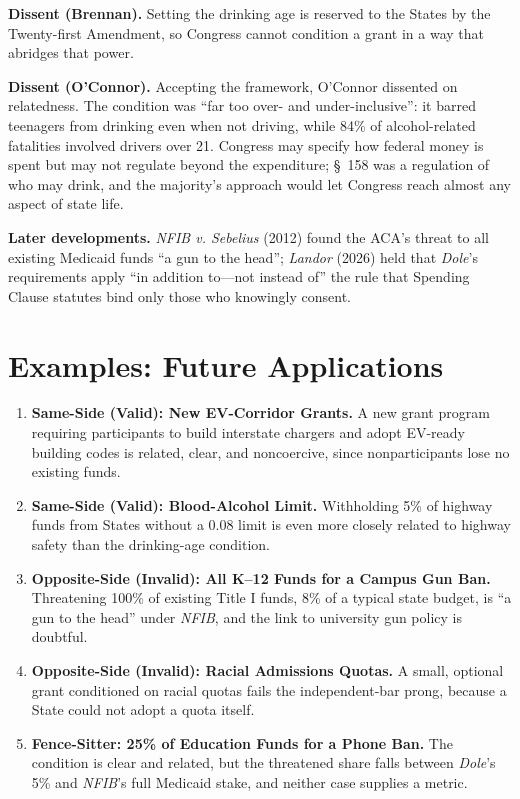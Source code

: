 \documentclass[12pt]{article}
\begin{document}
\textbf{Dissent (Brennan).} Setting the drinking age is reserved to the States by the Twenty-first Amendment, so Congress cannot condition a grant in a way that abridges that power.

\textbf{Dissent (O'Connor).} Accepting the framework, O'Connor dissented on relatedness. The condition was ``far too over- and under-inclusive'': it barred teenagers from drinking even when not driving, while 84\% of alcohol-related fatalities involved drivers over 21. Congress may specify how federal money is spent but may not regulate beyond the expenditure; \S~158 was a regulation of who may drink, and the majority's approach would let Congress reach almost any aspect of state life.

\textbf{Later developments.} \textit{NFIB v. Sebelius} (2012) found the ACA's threat to all existing Medicaid funds ``a gun to the head''; \textit{Landor} (2026) held that \textit{Dole}'s requirements apply ``in addition to---not instead of'' the rule that Spending Clause statutes bind only those who knowingly consent.

\section{Examples: Future Applications}

\begin{enumerate}
\item \textbf{Same-Side (Valid): New EV-Corridor Grants.} A new grant program requiring participants to build interstate chargers and adopt EV-ready building codes is related, clear, and noncoercive, since nonparticipants lose no existing funds.
\item \textbf{Same-Side (Valid): Blood-Alcohol Limit.} Withholding 5\% of highway funds from States without a 0.08 limit is even more closely related to highway safety than the drinking-age condition.
\item \textbf{Opposite-Side (Invalid): All K--12 Funds for a Campus Gun Ban.} Threatening 100\% of existing Title I funds, 8\% of a typical state budget, is ``a gun to the head'' under \textit{NFIB}, and the link to university gun policy is doubtful.
\item \textbf{Opposite-Side (Invalid): Racial Admissions Quotas.} A small, optional grant conditioned on racial quotas fails the independent-bar prong, because a State could not adopt a quota itself.
\item \textbf{Fence-Sitter: 25\% of Education Funds for a Phone Ban.} The condition is clear and related, but the threatened share falls between \textit{Dole}'s 5\% and \textit{NFIB}'s full Medicaid stake, and neither case supplies a metric.
\end{enumerate}
\end{document}
